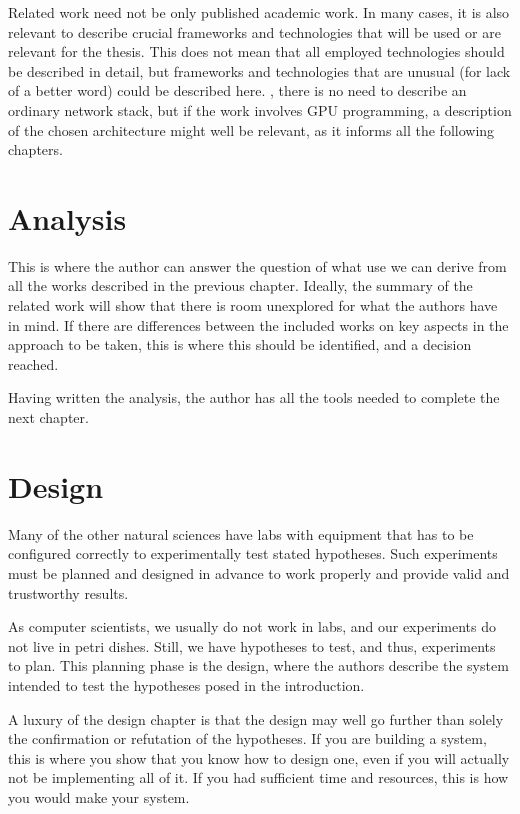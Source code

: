 \documentclass[ twoside,openright,titlepage,numbers=noenddot,headinclude,%
                footinclude=true,cleardoublepage=empty,abstractoff, %
                BCOR=5mm,paper=a4,fontsize=11pt,%
                ngerman,american,%
                ]{scrreprt}
\begin{document}
Related work need not be only published academic work. In many cases,
it is also relevant to describe crucial frameworks and technologies
that will be used or are relevant for the thesis.  This does not mean
that all employed technologies should be described in detail, but
frameworks and technologies that are unusual (for lack of a better
word) could be described here. \Eg, there is no need to describe an
ordinary network stack, but if the work involves GPU programming, a
description of the chosen architecture might well be relevant, as it
informs all the following chapters.



\chapter{Analysis}
\label{cha:analysis}

This is where the author can answer the question of what use we can
derive from all the works described in the previous chapter. Ideally,
the summary of the related work will show that there is room
unexplored for what the authors have in mind. If there are differences
between the included works on key aspects in the approach to be taken,
this is where this should be identified, and a decision reached.

Having written the analysis, the author has all the tools needed to
complete the next chapter.


\chapter{Design}
\label{cha:design}

Many of the other natural sciences have labs with equipment that has
to be configured correctly to experimentally test stated hypotheses.
Such experiments must be planned and designed in advance to work
properly and provide valid and trustworthy results.

As computer scientists, we usually do not work in labs, and our
experiments do not live in petri dishes. Still, we have hypotheses to
test, and thus, experiments to plan. This planning phase is the
design, where the authors describe the system intended to test the
hypotheses posed in the introduction.

A luxury of the design chapter is that the design may well go further
than solely the confirmation or refutation of the hypotheses.  If you
are building a system, this is where you show that you know how to
design one, even if you will actually not be implementing all of it.
If you had sufficient time and resources, this is how you would make
your system.
\end{document}
